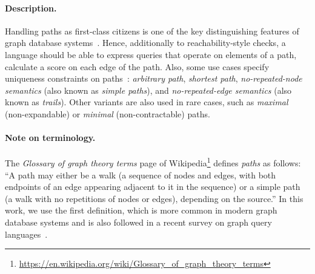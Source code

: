 
\paragraph{Description.}

Handling paths as first-class citizens is one of the key distinguishing features
of graph database systems~\cite{DBLP:conf/sigmod/AnglesABBFGLPPS18}. Hence,
additionally to reachability-style checks, a language should be able to express
queries that operate on elements of a path, \eg calculate a score on each edge
of the path. Also, some use cases specify uniqueness constraints on
paths~\cite{DBLP:journals/csur/AnglesABHRV17}: \emph{arbitrary path},
\emph{shortest path}, \emph{no-repeated-node semantics} (also known as
\emph{simple paths}), and \emph{no-repeated-edge semantics} (also known as
\emph{trails}). Other variants are also used in rare cases, such as
\emph{maximal} (non-expandable) or \emph{minimal} (non-contractable) paths.

\paragraph{Note on terminology.}

The \emph{Glossary of graph theory terms} page of
Wikipedia\footnote{\url{https://en.wikipedia.org/wiki/Glossary_of_graph_theory_terms}}
defines \emph{paths} as follows: ``A path may either be a walk (a sequence of
nodes and edges, with both endpoints of an edge appearing adjacent to it in the
sequence) or a simple path (a walk with no repetitions of nodes or edges),
depending on the source.'' In this work, we use the first definition, which is
more common in modern graph database systems and is also followed in a recent
survey on graph query languages~\cite{DBLP:journals/csur/AnglesABHRV17}.


